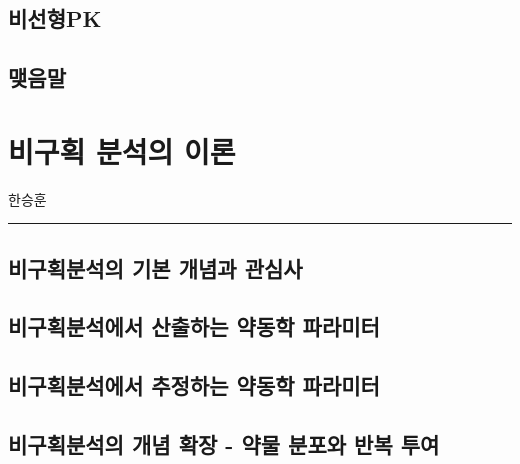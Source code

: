\documentclass[
  11pt,
  krantz2, a4paper, twoside]{krantz}
\begin{document}
\hypertarget{uxbe44uxc120uxd615pk}{%
\section{비선형PK}\label{uxbe44uxc120uxd615pk}}

\hypertarget{uxb9fauxc74cuxb9d0}{%
\section{맺음말}\label{uxb9fauxc74cuxb9d0}}

\hypertarget{nca-principle}{%
\chapter{비구획 분석의 이론}\label{nca-principle}}

\Large\hfill

한승훈
\normalsize

\begin{center}\rule{0.5\linewidth}{0.5pt}\end{center}

\hypertarget{uxbe44uxad6cuxd68duxbd84uxc11duxc758-uxae30uxbcf8-uxac1cuxb150uxacfc-uxad00uxc2ecuxc0ac}{%
\section{비구획분석의 기본 개념과 관심사}\label{uxbe44uxad6cuxd68duxbd84uxc11duxc758-uxae30uxbcf8-uxac1cuxb150uxacfc-uxad00uxc2ecuxc0ac}}

\hypertarget{uxbe44uxad6cuxd68duxbd84uxc11duxc5d0uxc11c-uxc0b0uxcd9cuxd558uxb294-uxc57duxb3d9uxd559-uxd30cuxb77cuxbbf8uxd130}{%
\section{비구획분석에서 산출하는 약동학 파라미터}\label{uxbe44uxad6cuxd68duxbd84uxc11duxc5d0uxc11c-uxc0b0uxcd9cuxd558uxb294-uxc57duxb3d9uxd559-uxd30cuxb77cuxbbf8uxd130}}

\hypertarget{uxbe44uxad6cuxd68duxbd84uxc11duxc5d0uxc11c-uxcd94uxc815uxd558uxb294-uxc57duxb3d9uxd559-uxd30cuxb77cuxbbf8uxd130}{%
\section{비구획분석에서 추정하는 약동학 파라미터}\label{uxbe44uxad6cuxd68duxbd84uxc11duxc5d0uxc11c-uxcd94uxc815uxd558uxb294-uxc57duxb3d9uxd559-uxd30cuxb77cuxbbf8uxd130}}

\hypertarget{uxbe44uxad6cuxd68duxbd84uxc11duxc758-uxac1cuxb150-uxd655uxc7a5---uxc57duxbb3c-uxbd84uxd3ecuxc640-uxbc18uxbcf5-uxd22cuxc5ec}{%
\section{비구획분석의 개념 확장 - 약물 분포와 반복 투여}\label{uxbe44uxad6cuxd68duxbd84uxc11duxc758-uxac1cuxb150-uxd655uxc7a5---uxc57duxbb3c-uxbd84uxd3ecuxc640-uxbc18uxbcf5-uxd22cuxc5ec}}
\end{document}

